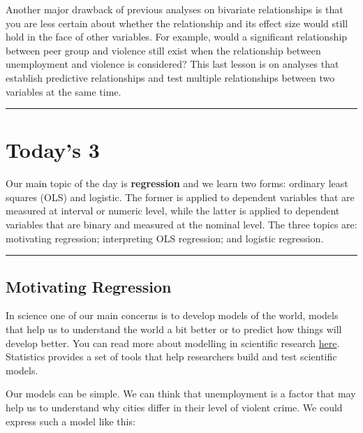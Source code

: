 \documentclass[
]{book}
\begin{document}
Another major drawback of previous analyses on bivariate relationships is that you are less certain about whether the relationship and its effect size would still hold in the face of other variables. For example, would a significant relationship between peer group and violence still exist when the relationship between unemployment and violence is considered? This last lesson is on analyses that establish predictive relationships and test multiple relationships between two variables at the same time.

\begin{center}\rule{0.5\linewidth}{0.5pt}\end{center}

\hypertarget{todays-3-5}{%
\section{Today's 3}\label{todays-3-5}}

Our main topic of the day is \textbf{regression} and we learn two forms: ordinary least squares (OLS) and logistic. The former is applied to dependent variables that are measured at interval or numeric level, while the latter is applied to dependent variables that are binary and measured at the nominal level. The three topics are: motivating regression; interpreting OLS regression; and logistic regression.

\begin{center}\rule{0.5\linewidth}{0.5pt}\end{center}

\hypertarget{motivating-regression}{%
\subsection{Motivating Regression}\label{motivating-regression}}

In science one of our main concerns is to develop models of the world, models that help us to understand the world a bit better or to predict how things will develop better. You can read more about modelling in scientific research \href{https://www.visionlearning.com/en/library/Process-of-Science/49/Modeling-in-Scientific-Research/153}{here}. Statistics provides a set of tools that help researchers build and test scientific models.

Our models can be simple. We can think that unemployment is a factor that may help us to understand why cities differ in their level of violent crime. We could express such a model like this:
\end{document}
